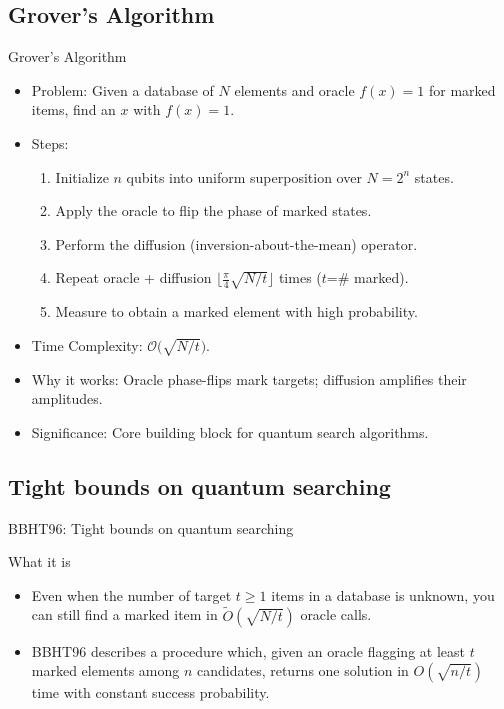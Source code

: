 \documentclass{beamer}
\begin{document}
\subsection{Grover's Algorithm}
\begin{frame}{Grover's Algorithm}
    \begin{itemize}
        \item Problem: Given a database of \(N\) elements and oracle \(f(x)=1\) for marked items, find an \(x\) with \(f(x)=1\).
        \item Steps:
              \begin{enumerate}
                  \item Initialize \(n\) qubits into uniform superposition over \(N=2^n\) states.
                  \item Apply the oracle to flip the phase of marked states.
                  \item Perform the diffusion (inversion-about-the-mean) operator.
                  \item Repeat oracle + diffusion \(\bigl\lfloor\frac{\pi}{4}\sqrt{N/t}\bigr\rfloor\) times (\(t\)=\# marked).
                  \item Measure to obtain a marked element with high probability.
              \end{enumerate}
        \item Time Complexity: \(\mathcal{O}\!\bigl(\sqrt{N/t}\bigr)\).
        \item Why it works: Oracle phase-flips mark targets; diffusion amplifies their amplitudes.
        \item Significance: Core building block for quantum search algorithms.
    \end{itemize}
\end{frame}

\subsection{Tight bounds on quantum searching}
\begin{frame}{BBHT96: Tight bounds on quantum searching}
    \begin{block}{What it is}
        \begin{itemize}
            \item Even when the number of target \(t \ge 1\) items in a database is unknown,
                  you can still find a marked item in \(\tilde O(\sqrt{N/t})\) oracle calls.
            \item BBHT96 describes a procedure which, given an oracle flagging at least \(t\) marked
                  elements among \(n\) candidates, returns one solution in \(O(\sqrt{n/t})\) time
                  with constant success probability.
        \end{itemize}
    \end{block}
\end{frame}
\end{document}
